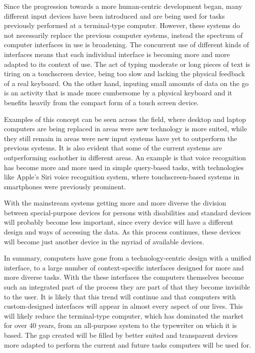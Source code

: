 Since the progression towards a more human-centric development began, many different input devices have been introduced and are being used for tasks previously performed at a terminal-type computer. However, these systems do not necessarily replace the previous computer systems, instead the spectrum of computer interfaces in use is broadening. The concurrent use of different kinds of interfaces means that each individual interface is becoming more and more adapted to its context of use. The act of typing moderate or long pieces of text is tiring on a touchscreen device, being too slow and lacking the physical feedback of a real keyboard. On the other hand, inputing small amounts of data on the go is an activity that is made more cumbersome by a physical keyboard and it benefits heavily from the compact form of a touch screen device.

Examples of this concept can be seen across the field, where desktop and laptop computers are being replaced in areas were new technology is more suited, while they still remain in areas were new input systems have yet to outperform the previous systems. It is also evident that some of the current systems are outperforming eachother in different areas. An example is that voice recognition has become more and more used in simple query-based tasks, with technologies like Apple's Siri voice recognition system, where touchscreen-based systems in smartphones were previously prominent.

With the mainstream systems getting more and more diverse the division between special-purpose devices for persons with disabilities and standard devices will probably become less important, since every device will have a different design and ways of accessing the data. As this process continues, these devices will become just another device in the myriad of available devices.

In summary, computers have gone from a technology-centric design with a unified interface, to a large number of context-specific interfaces designed for more and more diverse tasks. With the these interfaces the computers themselves become such an integrated part of the process they are part of that they become invisible to the user. It is likely that this trend will continue and that computers with custom-designed interfaces will appear in almost every aspect of our lives. This will likely reduce the terminal-type computer, which has dominated the market for over 40 years, from an all-purpose system to the typewriter on which it is based. The gap created will be filled by better suited and transparent devices more adapted to perform the current and future tasks computers will be used for.